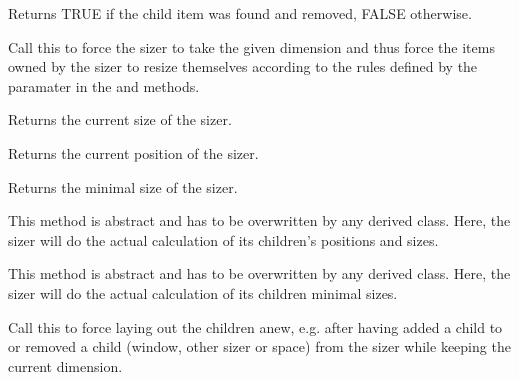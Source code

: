 Returns TRUE if the child item was found and removed, FALSE otherwise.

\label{wxsizersetdimension}


Call this to force the sizer to take the given dimension and thus force the items owned
by the sizer to resize themselves according to the rules defined by the paramater in the
 and  methods.

\label{wxsizergetsize}


Returns the current size of the sizer.

\label{wxsizergetposition}


Returns the current position of the sizer.

\label{wxsizergetminsize}


Returns the minimal size of the sizer.

\label{wxsizerrecalcsizes}


This method is abstract and has to be overwritten by any derived class.
Here, the sizer will do the actual calculation of its children's positions
and sizes.

\label{wxsizercalcmin}


This method is abstract and has to be overwritten by any derived class.
Here, the sizer will do the actual calculation of its children minimal sizes.

\label{wxsizerlayout}


Call this to force laying out the children anew, e.g. after having added a child
to or removed a child (window, other sizer or space) from the sizer while keeping
the current dimension.

\label{wxsizerfit}

